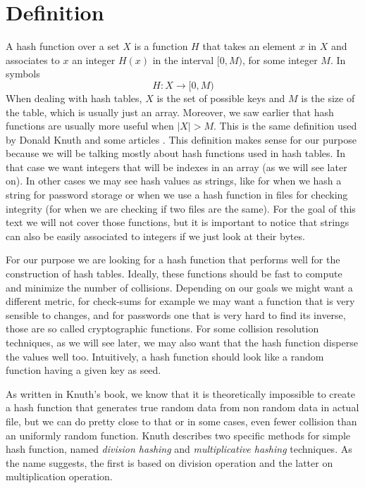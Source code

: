 \bigskip

\section{Definition}

A hash function over a set \( X \) is a function \( H \) that takes an element \( x \) in \( X \) and associates to \( x \) an integer \( H(x) \) in the interval \( [0,M) \), for some integer \( M \). In symbols
\[ H: X \rightarrow [0, M) \]
When dealing with hash tables, \( X \) is the set of possible keys and \( M \) is the size of the table, which is usually just an array. Moreover, we saw earlier that hash functions are usually more useful when \( |X| > M \). This is the same definition used by Donald Knuth \citep{TAOCP3} and some articles \citep{RobinHoodHashing}. This definition makes sense for our purpose because we will be talking mostly about hash functions used in hash tables. In that case we want integers that will be indexes in an array (as we will see later on). In other cases we may see hash values as strings, like for when we hash a string for password storage or when we use a hash function in files for checking integrity (for when we are checking if two files are the same). For the goal of this text we will not cover those functions, but it is important to notice that strings can also be easily associated to integers if we just look at their bytes.

For our purpose we are looking for a hash function that performs well for the construction of hash tables. Ideally, these functions should be fast to compute and minimize the number of collisions. Depending on our goals we might want a different metric, for check-sums for example we may want a function that is very sensible to changes, and for passwords one that is very hard to find its inverse, those are so called cryptographic functions. For some collision resolution techniques, as we will see later, we may also want that the hash function disperse the values well too. Intuitively, a hash function should look like a random function having a given key as seed.

As written in Knuth's book, we know that it is theoretically impossible to create a hash function that generates true random data from non random data in actual file, but we can do pretty close to that or in some cases, even fewer collision than an uniformly random function. Knuth describes two specific methods for simple hash function, named \textit{division hashing} and \textit{multiplicative hashing} techniques. As the name suggests, the first is based on division operation and the latter on multiplication operation.

